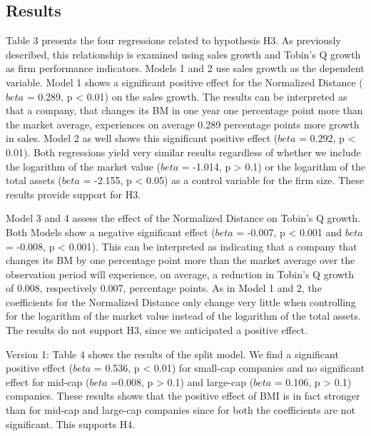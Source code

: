 \documentclass[
]{article}
\begin{document}
\newpage{}

\subsection{Results}\label{results}

Table 3 presents the four regressions related to hypothesis H3. As
previously described, this relationship is examined using sales growth
and Tobin's Q growth as firm performance indicators. Models 1 and 2 use
sales growth as the dependent variable. Model 1 shows a significant
positive effect for the Normalized Distance (\(beta\) = 0.289, p
\textless{} 0.01) on the sales growth. The results can be interpreted as
that a company, that changes its BM in one year one percentage point
more than the market average, experiences on average 0.289 percentage
points more growth in sales. Model 2 as well shows this significant
positive effect (\(beta\) = 0.292, p \textless{} 0.01). Both regressions
yield very similar results regardless of whether we include the
logarithm of the market value (\(beta\) = -1.014, p \textgreater{} 0.1)
or the logarithm of the total assets (\(beta\) = -2.155, p \textless{}
0.05) as a control variable for the firm size. These results provide
support for H3.

Model 3 and 4 assess the effect of the Normalized Distance on Tobin's Q
growth. Both Models show a negative significant effect (\(beta\) =
-0.007, p \textless{} 0.001 and \(beta\) = -0.008, p \textless{} 0.001).
This can be interpreted as indicating that a company that changes its BM
by one percentage point more than the market average over the
observation period will experience, on average, a reduction in Tobin's Q
growth of 0.008, respectively 0.007, percentage points. As in Model 1
and 2, the coefficients for the Normalized Distance only change very
little when controlling for the logarithm of the market value instead of
the logarithm of the total assets. The results do not support H3, since
we anticipated a positive effect.

Version 1: Table 4 shows the results of the split model. We find a
significant positive effect (\(beta\) = 0.536, p \textless{} 0.01) for
small-cap companies and no significant effect for mid-cap (\(beta\)
=0.008, p \textgreater{} 0.1) and large-cap (\(beta\) = 0.106, p
\textgreater{} 0.1) companies. These results shows that the positive
effect of BMI is in fact stronger than for mid-cap and large-cap
companies since for both the coefficients are not significant. This
supports H4.
\end{document}

